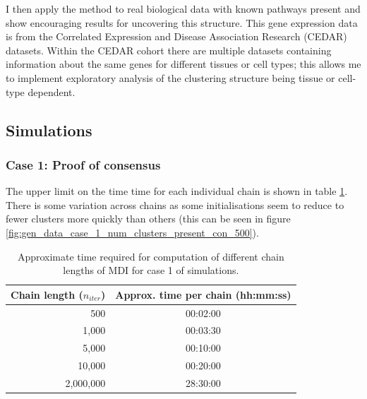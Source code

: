 \documentclass[12pt]{article} %
\begin{document}
	I then apply the method to real biological data with known pathways present and show encouraging results for uncovering this structure. This gene expression data is from the Correlated Expression and Disease Association Research (CEDAR) datasets. Within the CEDAR cohort there are multiple datasets containing information about the same genes for different tissues or cell types; this allows me to implement exploratory analysis of the clustering structure being tissue or cell-type dependent.
	
	\subsection{Simulations}
	\subsubsection{Case 1: Proof of consensus} \label{sec:results:case_1}
	The upper limit on the time time for each individual chain is shown in table \ref{table:results:sim_1:timing}. There is some variation across chains as some initialisations seem to reduce to fewer clusters more quickly than others (this can be seen in figure \ref{fig:gen_data_case_1_num_clusters_present_con_500}).
	
	\begin{table}[!htb] 
		\centering
		\begin{tabular}{r|c} 
			Chain length ($n_{iter}$)	& Approx. time per chain (hh:mm:ss)\\ 
			\hline
			500							& 00:02:00 \\
			1,000						& 00:03:30 \\
			5,000						& 00:10:00 \\
			10,000						& 00:20:00 \\
			2,000,000					& 28:30:00
		\end{tabular}
		\caption{Approximate time required for computation of different chain lengths of MDI for case 1 of simulations.}
		\label{table:results:sim_1:timing}
	\end{table}
\end{document}
